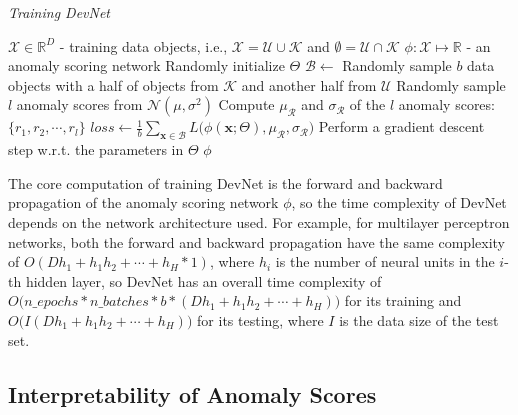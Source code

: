 \documentclass[sigconf]{acmart}
\begin{document}
\renewcommand{\algorithmicrequire}{\textbf{Input:}}
\renewcommand{\algorithmicensure}{\textbf{Output:}}
\begin{algorithm}
\small 
\caption{\textit{Training DevNet}}
\begin{algorithmic}[1]
\label{alg:devnet}
\REQUIRE $\mathcal{X} \in \mathbb{R}^{D}$ - training data objects, i.e., $\mathcal{X}=\mathcal{U} \cup \mathcal{K}$ and $\emptyset=\mathcal{U} \cap \mathcal{K}$ 
\ENSURE $\phi: \mathcal{X} \mapsto \mathbb{R}$ - an anomaly scoring network
\STATE Randomly initialize $\Theta$
        \STATE $\mathcal{B} \leftarrow$ Randomly sample $\mathit{b}$ data objects with a half of objects from $\mathcal{K}$ and another half from $\mathcal{U}$
        \STATE Randomly sample $l$ anomaly scores from $\mathcal{N}(\mu, \sigma^2)$
        \STATE Compute $\mu_{\mathcal{R}}$ and $\sigma_{\mathcal{R}}$ of the $l$ anomaly scores: $\{r_1, r_2, \cdots, r_l\}$
        \STATE $\mathit{loss} \leftarrow \frac{1}{b}\sum_{\mathbf{x} \in \mathcal{B}}L\big(\phi(\mathbf{x};\Theta), \mu_{\mathcal{R}}, \sigma_{\mathcal{R}} \big)$    
        \STATE Perform a gradient descent step w.r.t. the parameters in $\Theta$
    \ENDFOR
\ENDFOR
\RETURN $\phi$
\end{algorithmic}
\end{algorithm}

The core computation of training DevNet is the forward and backward propagation of the anomaly scoring network $\phi$, so the time complexity of DevNet depends on the network architecture used. For example, for multilayer perceptron networks, both the forward and backward propagation have the same complexity of $O(Dh_1+h_1h_2+\cdots+h_H*1)$, where $h_i$ is the number of neural units in the $i$-th hidden layer, so DevNet has an overall time complexity of $O\big( \mathit{n\_epochs} * \mathit{n\_batches} * \mathit{b} * (Dh_1+h_1h_2+\cdots+h_H) \big)$ for its training and $O\big( I(Dh_1+h_1h_2+\cdots+h_H) \big)$ for its testing, where $I$ is the data size of the test set.



\subsection{Interpretability of Anomaly Scores}
\end{document}

